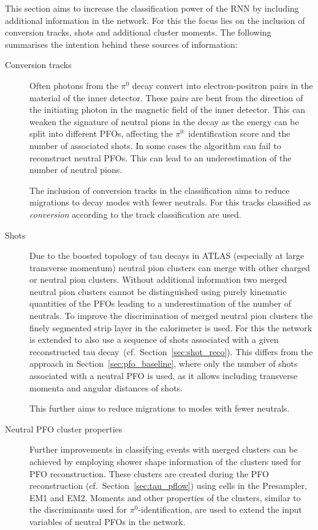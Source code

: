 This section aims to increase the classification power of the RNN by including
additional information in the network. For this the focus lies on the inclusion
of conversion tracks, shots and additional cluster moments. The following
summarises the intention behind these sources of information:
\begin{description}
\item[Conversion tracks] Often photons from the $\pi^0$ decay convert into
  electron-positron pairs in the material of the inner detector. These pairs are
  bent from the direction of the initiating photon in the magnetic field of the
  inner detector. This can weaken the signature of neutral pions in the decay as
  the energy can be split into different PFOs, affecting the
  $\pi^0$~identification score and the number of associated shots. In some cases
  the algorithm can fail to reconstruct neutral PFOs. This can lead to an
  underestimation of the number of neutral pions.

  The inclusion of conversion tracks in the classification aims to reduce
  migrations to decay modes with fewer neutrals. For this tracks classified as
  \emph{conversion} according to the track classification are used.

\item[Shots] Due to the boosted topology of tau decays in ATLAS (especially at
  large transverse momentum) neutral pion clusters can merge with other charged
  or neutral pion clusters. Without additional information two merged neutral
  pion clusters cannot be distinguished using purely kinematic quantities of the
  PFOs leading to a underestimation of the number of neutrals. To improve the
  discrimination of merged neutral pion clusters the finely segmented strip
  layer in the calorimeter is used. For this the network is extended to also use
  a sequence of shots associated with a given reconstructed tau decay~(cf.\
  Section~\ref{sec:shot_reco}). This differs from the approach in
  Section~\ref{sec:pfo_baseline}, where only the number of shots associated with
  a neutral PFO is used, as it allows including transverse momenta and angular
  distances of shots.

  This further aims to reduce migrations to modes with fewer neutrals.

\item[Neutral PFO cluster properties] Further improvements in classifying events
  with merged clusters can be achieved by employing shower shape information of
  the clusters used for PFO reconstruction. These clusters are created during
  the PFO reconstruction (cf.\ Section~\ref{sec:tau_pflow}) using cells in the
  Presampler, EM1 and EM2. Moments and other properties of the clusters, similar
  to the discriminants used for $\pi^0$-identification, are used to extend the
  input variables of neutral PFOs in the network.
\end{description}

